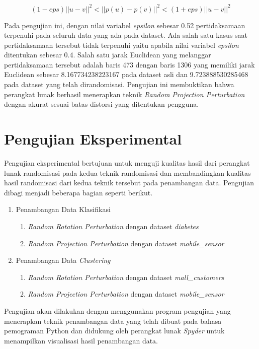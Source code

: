 \begin{equation}
	(1-eps)||u - v||^{2}<||p(u) - p(v)||^{2}<(1+eps)||u - v||^{2}
\end{equation}

Pada pengujian ini, dengan nilai variabel \textit{epsilon} sebesar 0.52 pertidaksamaan terpenuhi pada seluruh data yang ada pada dataset. Ada salah satu kasus saat pertidaksamaan tersebut tidak terpenuhi yaitu apabila nilai variabel \textit{epsilon} ditentukan sebesar 0.4. Salah satu jarak Euclidean yang melanggar pertidaksamaan tersebut adalah baris 473 dengan baris 1306 yang memiliki jarak Euclidean sebesar 8.167734238223167 pada dataset asli dan 9.723888530285468 pada dataset yang telah dirandomisasi. Pengujian ini membuktikan bahwa perangkat lunak berhasil menerapkan teknik \textit{Random Projection Perturbation} dengan akurat sesuai batas distorsi yang ditentukan pengguna.

\section{Pengujian Eksperimental}
\label{sec:pengujianeksperimental}

Pengujian eksperimental bertujuan untuk menguji kualitas hasil dari perangkat lunak randomisasi pada kedua teknik randomisasi dan membandingkan kualitas hasil randomisasi dari kedua teknik tersebut pada penambangan data. Pengujian dibagi menjadi beberapa bagian seperti berikut.

\begin{enumerate}
	\item Penambangan Data Klasifikasi
	\begin{enumerate}
		\item \textit{Random Rotation Perturbation} dengan dataset \textit{diabetes}
		\item \textit{Random Projection Perturbation} dengan dataset \textit{mobile\_sensor}
	\end{enumerate}
	\item Penambangan Data \textit{Clustering}
	\begin{enumerate}
		\item \textit{Random Rotation Perturbation} dengan dataset \textit{mall\_customers}
		\item \textit{Random Projection Perturbation} dengan dataset \textit{mobile\_sensor}
	\end{enumerate}
\end{enumerate}

Pengujian akan dilakukan dengan menggunakan program pengujian yang menerapkan teknik penambangan data yang telah dibuat pada bahasa pemograman Python dan didukung oleh perangkat lunak \textit{Spyder} untuk menampilkan visualisasi hasil penambangan data.

